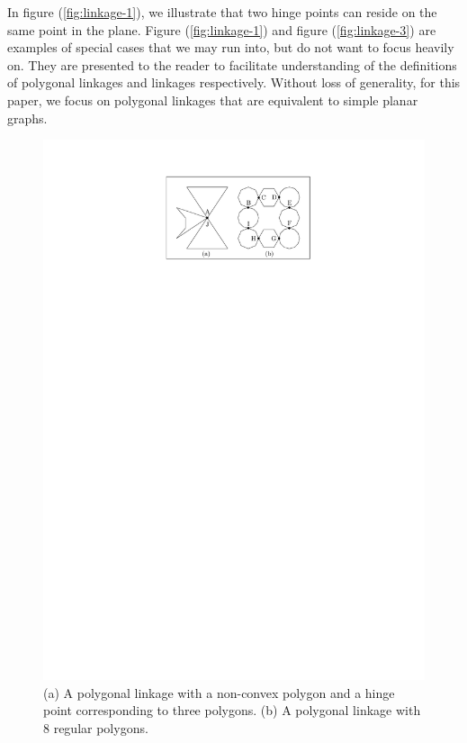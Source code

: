 In figure (\ref{fig:linkage-1}), we illustrate that two hinge points can reside on the same point 
in the plane. Figure (\ref{fig:linkage-1}) and figure (\ref{fig:linkage-3}) are examples of special 
cases that we may run into, but do not want to focus heavily on.  They are presented to the reader 
to facilitate understanding of the definitions of polygonal linkages and linkages respectively.  
Without loss of generality, for this paper, we focus on polygonal linkages that are 
equivalent to simple planar graphs.
\begin{figure}[h]
\begin{center}
\includegraphics[scale=1]{graphics/PolygonalLinkageExamples.pdf}
\end{center} 
\caption{(a) A polygonal linkage with a non-convex polygon and a hinge point corresponding to three 
polygons.  (b) A polygonal linkage with 8 regular polygons.}
\label{fig:linkage-2}
\end{figure}

